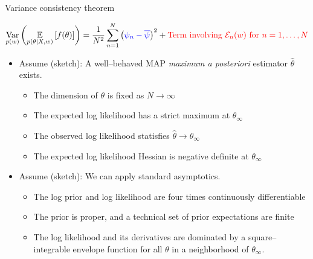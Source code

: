 \begin{frame}[t]{Variance consistency theorem}

%
\begin{align*}
    \underset{p(w)}{\mathrm{Var}}\left(\underset{p(\theta \vert X, w)}{\mathbb{E}}\left[f(\theta)\right]\right)
    = 
    \frac{1}{N^2} \sum_{n=1}^N \left(
        \textcolor{blue}{\psi_n - \overline{\psi}}
    \right)^2 +
    \textcolor{red}{\textrm{Term involving }
        \textcolor{red}{\mathcal{E}_n}(w)
        \textrm{ for }n =1,\dots,N
    }
\end{align*}
%
\def\thetatrue{\theta_{\infty}}
\def\thetahat{\hat\theta}


\def\normdist{\mathcal{N}}

\def\gcovtrue{V^g}
\def\gcovij{V^{\mathrm{IJ}}}

\pause
%
\begin{itemize}
    \item Assume (sketch): A well--behaved MAP \textit{maximum a posteriori} estimator $\thetahat$ exists.
    \begin{itemize}
        \item The dimension of $\theta$ is fixed as $N \rightarrow \infty$
        \item The expected log likelihood has a strict maximum at $\thetatrue$
        \item The observed log likelihood statisfies $\thetahat \rightarrow \thetatrue$
        \item The expected log likelihood Hessian is negative definite at $\thetatrue$ 
    \end{itemize}
    \item Assume (sketch): We can apply standard asymptotics.
    \begin{itemize}
    \item The log prior and log likelihood are four times continuously differentiable
    \item The prior is proper, and a technical set of prior expectations are finite
    \item The log likelihood and its derivatives are dominated by a square--integrable envelope function 
          for all $\theta$ in a neighborhood of $\theta_\infty$.
    \end{itemize}
\end{itemize}
%
\pause


\end{frame}
